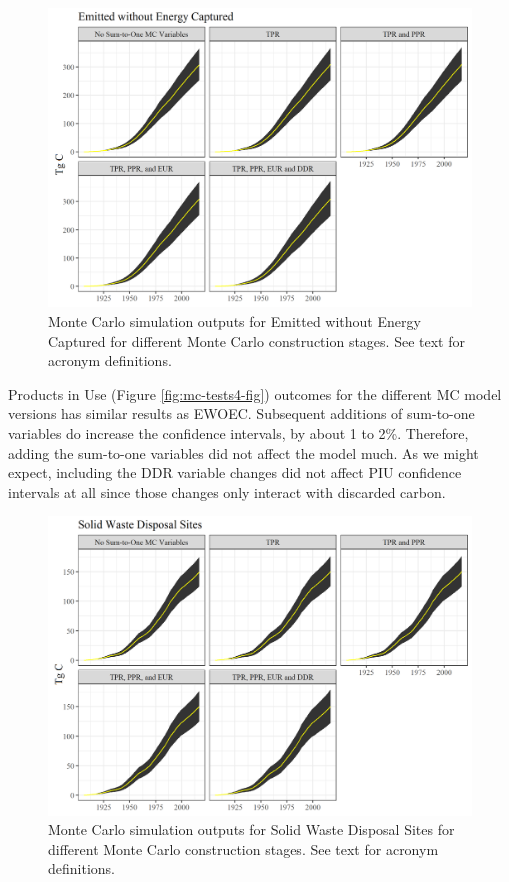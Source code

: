 \documentclass[
  openany]{book}
\begin{document}
\begin{figure}
\includegraphics[width=1\linewidth]{images/MC_tests2} \caption{Monte Carlo simulation outputs for Emitted without Energy Captured for different Monte Carlo construction stages.  See text for acronym definitions.}\label{fig:mc-tests2-fig}
\end{figure}

Products in Use (Figure \ref{fig:mc-tests4-fig}) outcomes for the different MC model versions has similar results as EWOEC. Subsequent additions of sum-to-one variables do increase the confidence intervals, by about 1 to 2\%. Therefore, adding the sum-to-one variables did not affect the model much. As we might expect, including the DDR variable changes did not affect PIU confidence intervals at all since those changes only interact with discarded carbon.

\begin{figure}
\includegraphics[width=1\linewidth]{images/MC_tests3} \caption{Monte Carlo simulation outputs for Solid Waste Disposal Sites for different Monte Carlo construction stages.  See text for acronym definitions.}\label{fig:mc-tests3-fig}
\end{figure}
\end{document}

